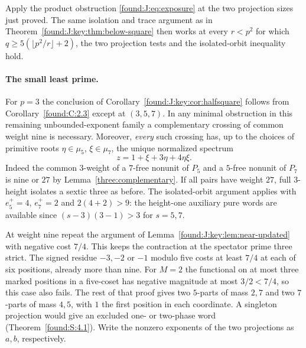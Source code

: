 \documentclass[11pt,a4paper]{article}
\numberwithin{equation}{section}
\theoremstyle{remark}
\begin{document}
Apply the product obstruction \eqref{found:J:eq:exposure} at the two
projection sizes just proved. The same isolation and trace argument
as in Theorem~\ref{found:J:key:thm:below-square} then works at every
$r<p^2$ for which $q\ge5(\lfloor p^2/r\rfloor+2)$, the two
projection tests and the isolated-orbit inequality hold.

\paragraph{The small least prime.}
For $p=3$ the conclusion of Corollary~\ref{found:J:key:cor:halfsquare} follows
from Corollary~\ref{found:C:2.3} except at $(3,5,7)$. In any minimal
obstruction in this remaining unbounded-exponent family a complementary
crossing of common weight nine is necessary. Moreover, \emph{every}
such crossing has, up to the choices of primitive roots
$\eta\in\mu_5$, $\xi\in\mu_7$, the unique normalized spectrum
\[
                     z=1+\xi+3\eta+4\eta\xi .
\]
Indeed the common $3$-weight of a $7$-free nonunit of $P_5$ and a
$5$-free nonunit of $P_7$ is nine or $27$ by Lemma~\ref{three:complementary}.
If all pairs have weight $27$, full $3$-height isolates a sextic
three as before. The isolated-orbit argument applies with
$e_5^+=4$, $e_7^+=2$ and $2(4+2)>9$: the height-one auxiliary
pure words are available since $(s-3)(3-1)>3$ for $s=5,7$.

At weight nine repeat the argument of Lemma~\ref{found:J:key:lem:near-updated} with negative
cost $7/4$. This keeps the contraction at the spectator prime three
strict. The signed residue $-3,-2$ or $-1$ modulo five costs at
least $7/4$ at each of six positions, already more than nine.
For $M=2$ the functional on at most three marked positions in a
five-coset has negative magnitude at most $3/2<7/4$, so this case
also fails. The rest of that proof gives two $5$-parts of mass
$2,7$ and two $7$-parts of mass $4,5$, with $1$ the first position
in each coordinate. A singleton projection would give an excluded one- or two-phase word (Theorem~\ref{found:S:4.1}). Write the nonzero exponents
of the two projections as $a,b$, respectively.
\end{document}
